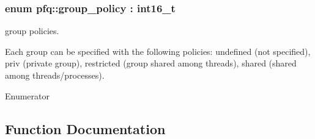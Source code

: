 \subsubsection[{\texorpdfstring{group\+\_\+policy}{group_policy}}]{\setlength{\rightskip}{0pt plus 5cm}enum {\bf pfq\+::group\+\_\+policy} \+: int16\+\_\+t\hspace{0.3cm}{\ttfamily [strong]}}\hypertarget{namespacepfq_ac41249c8510558905b01fa4d866a38d7}{}\label{namespacepfq_ac41249c8510558905b01fa4d866a38d7}


group policies. 

Each group can be specified with the following policies\+: undefined (not specified), priv (private group), restricted (group shared among threads), shared (shared among threads/processes). \begin{Desc}
\item[Enumerator]\par
\begin{description}
\item[{\em 
undefined\hypertarget{namespacepfq_ac41249c8510558905b01fa4d866a38d7a5e543256c480ac577d30f76f9120eb74}{}\label{namespacepfq_ac41249c8510558905b01fa4d866a38d7a5e543256c480ac577d30f76f9120eb74}
}]\item[{\em 
priv\hypertarget{namespacepfq_ac41249c8510558905b01fa4d866a38d7a908b453051b556e053731714a5193921}{}\label{namespacepfq_ac41249c8510558905b01fa4d866a38d7a908b453051b556e053731714a5193921}
}]\item[{\em 
restricted\hypertarget{namespacepfq_ac41249c8510558905b01fa4d866a38d7ac89b33f8b3f6f452ef6f07d397b5dcdf}{}\label{namespacepfq_ac41249c8510558905b01fa4d866a38d7ac89b33f8b3f6f452ef6f07d397b5dcdf}
}]\item[{\em 
shared\hypertarget{namespacepfq_ac41249c8510558905b01fa4d866a38d7a9e81e7b963c71363e2fb3eefcfecfc0e}{}\label{namespacepfq_ac41249c8510558905b01fa4d866a38d7a9e81e7b963c71363e2fb3eefcfecfc0e}
}]\end{description}
\end{Desc}


\subsection{Function Documentation}
